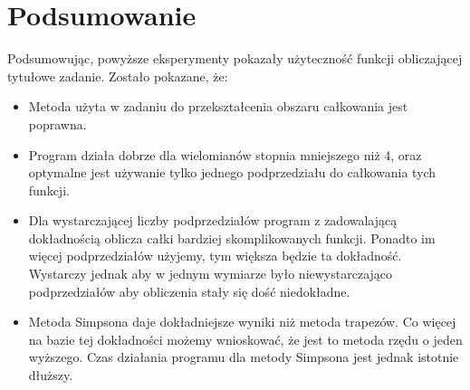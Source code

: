 \documentclass[12pt]{article}
\begin{document}
\section{Podsumowanie}
Podsumowując, powy\.zsze eksperymenty pokaza\l y u\.zyteczno\'s\'c funkcji 
obliczającej tytu\l owe zadanie. Zosta\l o pokazane, \.ze: \\
\begin{itemize}
        \item
            Metoda u\.zyta w zadaniu do przekszta\l cenia obszaru ca\l kowania
            jest poprawna.
        \item
            Program dzia\l a dobrze dla wielomian\'ow stopnia mniejszego 
            ni\.z 4, oraz optymalne jest u\.zywanie tylko jednego podprzedzia\l u
            do ca\l kowania tych funkcji.
        \item
            Dla wystarczającej liczby podprzedzia\l \'ow program z zadowalającą
            dok\l adno\'scią oblicza ca\l ki bardziej skomplikowanych funkcji.
            Ponadto im więcej podprzedzia\l \'ow u\.zyjemy, tym większa będzie 
            ta dok\l adno\'s\'c. Wystarczy jednak aby w jednym wymiarze 
            by\l o niewystarczająco podprzedzia\l \'ow aby obliczenia sta\l y
            się do\'s\'c niedok\l adne.
        \item
            Metoda Simpsona daje dok\l adniejsze wyniki ni\.z metoda trapez\'ow.
            Co więcej na bazie tej dok\l adno\'sci mo\.zemy wnioskowa\'c, \.ze 
            jest to metoda rzędu o jeden wy\.zszego. Czas dzia\l ania programu
            dla metody Simpsona jest jednak istotnie d\l u\.zszy.

\end{itemize}
\end{document}
